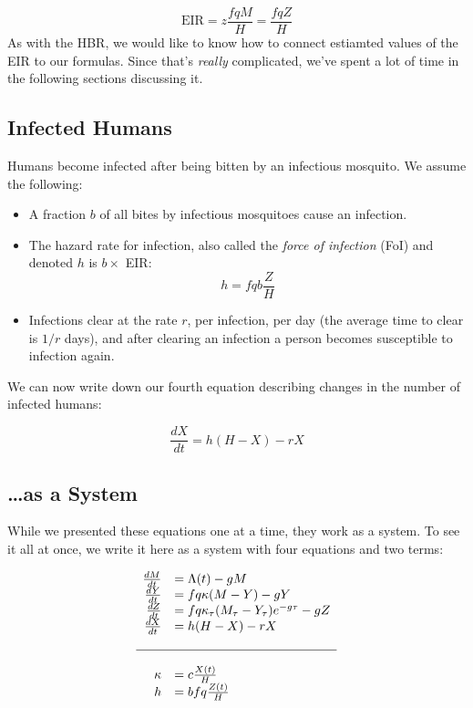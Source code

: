 \documentclass[
]{book}
\begin{document}
\[\mbox{EIR} = z \frac{fqM}{H} = \frac{fqZ}{H}\]
As with the HBR, we would like to know how to connect estiamted values of the EIR to our formulas. Since that's \emph{really} complicated, we've spent a lot of time in the following sections discussing it.

\subsection{Infected Humans}\label{RossEqn}

Humans become infected after being bitten by an infectious mosquito. We assume the following:

\begin{itemize}
\item
  A fraction \(b\) of all bites by infectious mosquitoes cause an infection.
\item
  The hazard rate for infection, also called the \emph{force of infection} (FoI) and denoted \(h\) is \(b \times\) EIR: \[h = fqb \frac{Z}{H}\]
\item
  Infections clear at the rate \(r\), per infection, per day (the average time to clear is \(1/r\) days), and after clearing an infection a person becomes susceptible to infection again.
\end{itemize}

We can now write down our fourth equation describing changes in the number of infected humans:

\begin{equation}
\frac{dX}{dt} = h (H-X) - r X 
\end{equation}

\subsection{\ldots as a System}\label{as-a-system}

While we presented these equations one at a time, they work as a system. To see it all at once, we write it here as a system with four equations and two terms:

\begin{equation}
\begin{array}{rl}
\frac{dM}{dt} &= \Lambda(t) - g M \\
\frac{dY}{dt} &= fq\kappa(M-Y) - g Y \\
\frac{dZ}{dt} &= fq\kappa_\tau(M_\tau-Y_\tau)e^{-g\tau} - g Z \\
\frac{dX}{dt} &= h (H-X) - rX  \\ \\ \hline \\ 
\kappa &= c \frac{X(t)}{H} \\
h &= b fq \frac{Z(t)}{H} \\
\end{array}
\end{equation}
\end{document}
